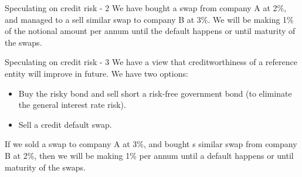 \documentclass{beamer}
\begin{document}
\newcommand{\paymentFlow}[4] {
	\draw [
		->,
		>=triangle 90
	]
	(#1) -- (#2)
	node[
		pos = 0.5,
		anchor = #4
	]
	{#3};
}

\begin{frame}{Speculating on credit risk - 2}
\justify
We have bought a swap from company A at 2\%, and managed to a sell similar swap to company B at 3\%. We will be making 1\% of the notional amount per annum until the default happens or until maturity of the swaps.

\justify
\centering
{}
\end{frame}



\begin{frame}{Speculating on credit risk - 3}
\justify
We have a view that creditworthiness of a reference entity will improve in future. We have two options: 
\begin{itemize}
\justifying
\item Buy the risky bond and sell short a risk-free government bond (to eliminate the general interest rate risk).
\item Sell a credit default swap.
\end{itemize}

\justify
If we sold a swap to company A at 3\%, and bought s similar swap from company B at 2\%, then we will be making 1\% per annum until a default happens or until maturity of the swaps.
\end{frame}
\end{document}
